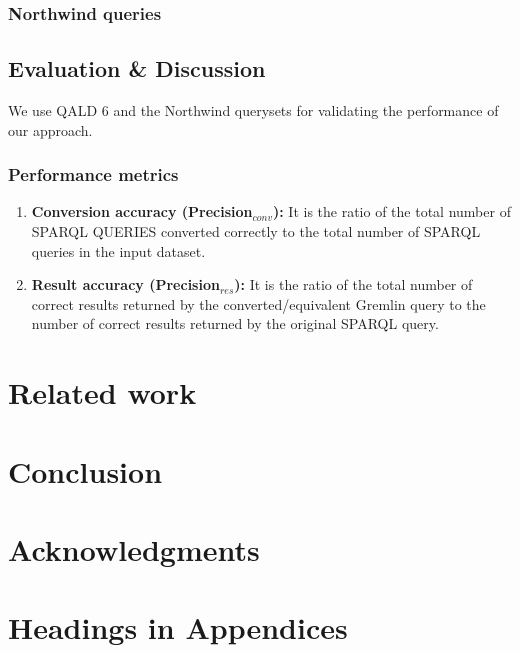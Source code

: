 \documentclass{sig-alternate-05-2015}
\begin{document}
\subsubsection{Northwind queries}


\subsection{Evaluation \& Discussion}
We use QALD 6 and the Northwind querysets for validating the performance of our approach.
\subsubsection{Performance metrics}
\begin{enumerate}
    \item \textbf{Conversion accuracy (Precision$_{conv}$):} It is the ratio of the total number of SPARQL QUERIES converted correctly to the total number of SPARQL queries in the input dataset.
    \item \textbf{Result accuracy (Precision$_{res}$):} It is the ratio of the total number of correct results returned by the converted/equivalent Gremlin query to the number of correct results returned by the original SPARQL query.
\end{enumerate}

\section{Related work}

\section{Conclusion}

\section{Acknowledgments}



\appendix

\section{Headings in Appendices}
\end{document}
